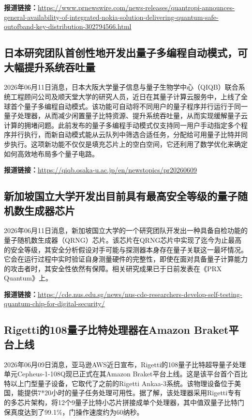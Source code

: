 \documentclass[12pt,a4paper]{ctexart}
\begin{document}
\noindent\textbf{报道链接：}\url{https://www.prnewswire.com/news-releases/quantropi-announces-general-availability-of-integrated-nokia-solution-delivering-quantum-safe-outofband-key-distribution-302794566.html}

\subsection{ 日本研究团队首创性地开发出量子多编程自动模式，可大幅提升系统吞吐量 }

2026年06月11日消息，日本大阪大学量子信息与量子生物学中心（QIQB）联合系统工程顾问公司及顺天堂大学的研究人员，近日在其量子计算云服务中，上线了全球首个量子多编程自动模式。该功能可自动将不同用户的量子程序并行运行于同一量子处理器，从而减少闲置量子比特资源、提升系统吞吐量，从而实现缓解量子云计算的拥堵问题。此前发布的量子多编程手动模式仅支持同一用户手动指定多个程序并行执行，而新自动模式能从云队列中筛选合适任务，分配给可用量子比特并同步执行。这项新功能不仅仅是填充芯片上的空白空间，它还利用了数学优化来确定如何高效地布局多个量子电路。

\noindent\textbf{报道链接：}\url{https://qiqb.osaka-u.ac.jp/en/newstopics/pr20260609}

\subsection{ 新加坡国立大学开发出目前具有最高安全等级的量子随机数生成器芯片 }

2026年06月11日消息，新加坡国立大学的一个研究团队开发出一种具备自检功能的量子随机数生成器（QRNG）芯片。该芯片在QRNG芯片中实现了迄今为止最高的安全等级，其安全分析假设对手可能与探测器本身存在量子关联这一最坏情况。它会在运行过程中实时验证自身测量硬件的完整性，即使在面对具备量子计算能力的攻击者时，其安全性依然有保障。相关研究成果已于日前发表在《PRX Quantum》上。

\noindent\textbf{报道链接：}\url{https://cde.nus.edu.sg/news/nus-cde-researchers-develop-self-testing-quantum-chip-for-digital-security/}


\subsection{ Rigetti的108量子比特处理器在Amazon Braket平台上线 }

2026年06月09日消息，亚马逊AWS近日宣布，Rigetti的108量子比特超导量子处理单元Cepheus-1-108Q现已正式在其Amazon Braket平台上线。这是该平台首个百比特以上门型量子设备，它取代了之前的Rigetti Ankaa-3系统。该物理设备位于美国，能提供7*20小时的量子任务处理可用性。据了解，该处理器采用Rigetti专有的多芯片架构，将12个9量子比特小芯片拼接成单个处理器，其中值双量子比特门保真度达到了99.1\%，门操作速度约为60纳秒。
\end{document}

